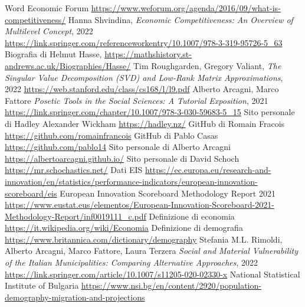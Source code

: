 \documentclass[a4paper,12pt, openright]{report}
\begin{document}
\begin{thebibliography}{9}

      Word Economic Forum
      \url{https://www.weforum.org/agenda/2016/09/what-is-competitiveness/}
      Hanna Shvindina,
      \textit{Economic Competitiveness: An Overview of Multilevel Concept},
      2022
      \url{https://link.springer.com/referenceworkentry/10.1007/978-3-319-95726-5_63}
      Biografia di Helmut Hasse,
      \url{https://mathshistory.st-andrews.ac.uk/Biographies/Hasse/}
      Tim Roughgarden, Gregory Valiant, 
      \textit{The Singular Value Decomposition (SVD) and Low-Rank Matrix Approximations}, 2022
      \url{https://web.stanford.edu/class/cs168/l/l9.pdf}
       Alberto Arcagni, Marco Fattore 
      \textit{Posetic Tools in the Social Sciences: A Tutorial Exposition}, 2021
      \url{https://link.springer.com/chapter/10.1007/978-3-030-59683-5_15}
      Sito personale di Hadley Alexander Wickham
     \url{https://hadley.nz/}
     GitHub di Romain Fracois
     \url{https://github.com/romainfrancois}
     GitHub di Pablo Casas
     \url{https://github.com/pablo14}
     Sito personale di Alberto Arcagni
     \url{https://albertoarcagni.github.io/}
     Sito personale di David Schoch 
     \url{https://mr.schochastics.net/}
     Dati EIS
     \url{https://ec.europa.eu/research-and-innovation/en/statistics/performance-indicators/european-innovation-scoreboard/eis}
     European Innovation Scoreboard Methodology Report 2021 
     \url{https://www.eustat.eus/elementos/European-Innovation-Scoreboard-2021-Methodology-Report/inf0019111_c.pdf}
     Definizione di economia
     \url{https://it.wikipedia.org/wiki/Economia}
     Definizione di demografia
     \url{https://www.britannica.com/dictionary/demography}
     Stefania M.L. Rimoldi, Alberto Arcagni, Marco Fattore, Laura Terzera
     \textit{Social and Material Vulnerability of the Italian Municipalities: Comparing Alternative Approaches},
     2022
     \url{https://link.springer.com/article/10.1007/s11205-020-02330-x}
     National Statistical Institute of Bulgaria 
     \url{https://www.nsi.bg/en/content/2920/population-demography-migration-and-projections}
\end{thebibliography}
\end{document}
